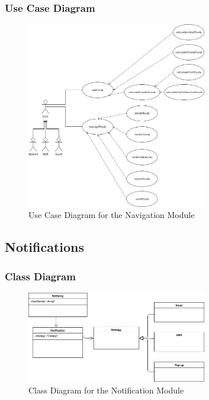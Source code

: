 \documentclass[runningheads,a4paper]{article}
\begin{document}
\subsubsection{Use Case Diagram}
\begin{figure}[H]
   	\centering
   	\includegraphics[width=0.7\textwidth]{Images/Diagrams/Navigation Module/Navigation-Module-Use-Case.jpg}
   	\caption{Use Case Diagram for the Navigation Module}
\end{figure}


\subsection{Notifications}

\subsubsection{Class Diagram}
\begin{figure}[H]
   	\centering
   	\includegraphics[width=0.7\textwidth]{Images/Diagrams/Notification Module/ClassDiagram.png}
   	\caption{Class Diagram for the Notification Module}
\end{figure}
\end{document}
